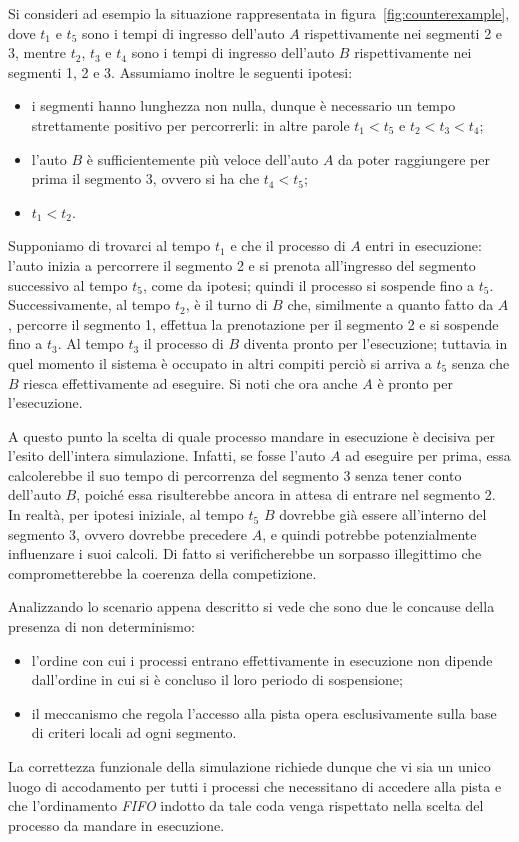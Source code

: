 Si consideri ad esempio la situazione rappresentata in figura~\ref{fig:counterexample}, dove $t_1$ e $t_5$ sono i tempi di ingresso dell'auto $A$ rispettivamente nei segmenti 2 e 3, mentre $t_2$, $t_3$ e $t_4$ sono i tempi di ingresso dell'auto $B$ rispettivamente nei segmenti 1, 2 e 3. Assumiamo inoltre le seguenti ipotesi:
\begin{itemize}
\item i segmenti hanno lunghezza non nulla, dunque è necessario un tempo strettamente positivo per percorrerli: in altre parole $t_1 < t_5$ e $t_2 < t_3 < t_4$;
\item l'auto $B$ è sufficientemente più veloce dell'auto $A$ da poter raggiungere per prima il segmento 3, ovvero si ha che $t_4 < t_5$;
\item $t_1 < t_2$.
\end{itemize}

Supponiamo di trovarci al tempo $t_1$ e che il processo di $A$ entri in esecuzione: l'auto inizia a percorrere il segmento 2 e si prenota all'ingresso del segmento successivo al tempo $t_5$, come da ipotesi; quindi il processo si sospende fino a $t_5$. Successivamente, al tempo $t_2$, è il turno di $B$ che, similmente a quanto fatto da $A$, percorre il segmento 1, effettua la prenotazione per il segmento 2 e si sospende fino a $t_3$. Al tempo $t_3$ il processo di $B$ diventa pronto per l'esecuzione; tuttavia in quel momento il sistema è occupato in altri compiti perciò si arriva a $t_5$ senza che $B$ riesca effettivamente ad eseguire. Si noti che ora anche $A$ è pronto per l'esecuzione.

A questo punto la scelta di quale processo mandare in esecuzione è decisiva per l'esito dell'intera simulazione. Infatti, se fosse l'auto $A$ ad eseguire per prima, essa calcolerebbe il suo tempo di percorrenza del segmento 3 senza tener conto dell'auto $B$, poiché essa risulterebbe ancora in attesa di entrare nel segmento 2. In realtà, per ipotesi iniziale, al tempo $t_5$ $B$ dovrebbe già essere all'interno del segmento 3, ovvero dovrebbe precedere $A$, e quindi potrebbe potenzialmente influenzare i suoi calcoli. Di fatto si verificherebbe un sorpasso illegittimo che comprometterebbe la coerenza della competizione.

Analizzando lo scenario appena descritto si vede che sono due le concause della presenza di non determinismo:
\begin{itemize}
\item l'ordine con cui i processi entrano effettivamente in esecuzione non dipende dall'ordine in cui si è concluso il loro periodo di sospensione;
\item il meccanismo che regola l'accesso alla pista opera esclusivamente sulla base di criteri locali ad ogni segmento.
\end{itemize}
La correttezza funzionale della simulazione richiede dunque che vi sia un unico luogo di accodamento per tutti i processi che necessitano di accedere alla pista e che l'ordinamento \textit{FIFO} indotto da tale coda venga rispettato nella scelta del processo da mandare in esecuzione.

